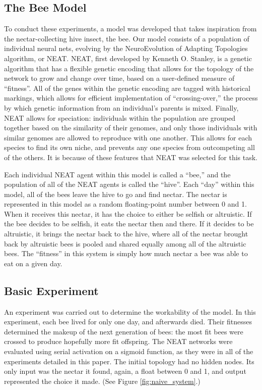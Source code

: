\documentclass[twoside]{article}
\begin{document}
\begin{multicols}{2}
		\subsection{The Bee Model} %
		\label{sub:the_bee_model}
			To conduct these experiments, a model was developed that takes inspiration from the nectar-collecting hive insect, the bee. Our model consists of a population of individual neural nets, evolving by the NeuroEvolution of Adapting Topologies algorithm, or NEAT.\cite{neat} NEAT, first developed by Kenneth O. Stanley, is a genetic algorithm that has a flexible genetic encoding that allows for the topology of the network to grow and change over time, based on a user-defined measure of ``fitness''. All of the genes within the genetic encoding are tagged with historical markings, which allows for efficient implementation of ``crossing-over,'' the process by which genetic information from an individual's parents is mixed. Finally, NEAT allows for speciation: individuals within the population are grouped together based on the similarity of their genomes, and only those individuals with similar genomes are allowed to reproduce with one another. This allows for each species to find its own niche, and prevents any one species from outcompeting all of the others. It is because of these features that NEAT was selected for this task.

			Each individual NEAT agent within this model is called a ``bee,'' and the population of all of the NEAT agents is called the ``hive''. Each ``day'' within this model, all of the bees leave the hive to go and find nectar. The nectar is represented in this model as a random floating-point number between 0 and 1. When it receives this nectar, it has the choice to either be selfish or altruistic. If the bee decides to be selfish, it eats the nectar then and there. If it decides to be altruistic, it brings the nectar back to the hive, where all of the nectar brought back by altruistic bees is pooled and shared equally among all of the altruistic bees. The ``fitness'' in this system is simply how much nectar a bee was able to eat on a given day.

		\subsection{Basic Experiment} %
		\label{sub:basic_experiment}
			An experiment was carried out to determine the workability of the model. In this experiment, each bee lived for only one day, and afterwards died. Their fitnesses determined the makeup of the next generation of bees: the most fit bees were crossed to produce hopefully more fit offspring. The NEAT networks were evaluated using serial activation on a sigmoid function, as they were in all of the experiments detailed in this paper. The initial topology had no hidden nodes. Its only input was the nectar it found, again, a float between 0 and 1, and output represented the choice it made. (See Figure \ref{fig:naive_system}.)


\end{multicols}
\end{document}
